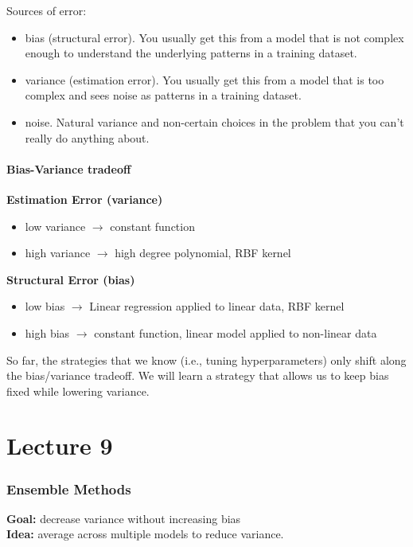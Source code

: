 \documentclass[12pt]{article}
\begin{document}
Sources of error:

\begin{itemize}
	\item bias (structural error). You usually get this from a model that is not complex enough to understand the underlying patterns in a training dataset. 
	\item variance (estimation error). You usually get this from a model that is too complex and sees noise as patterns in a training dataset.
	\item noise. Natural variance and non-certain choices in the problem that you can't really do anything about.
\end{itemize}

\subsection{Bias-Variance tradeoff}

\textbf{Estimation Error (variance)}
\begin{itemize}
	\item low variance $\rightarrow$ constant function
	\item high variance $\rightarrow$ high degree polynomial, RBF kernel 
\end{itemize}

\textbf{Structural Error (bias)}
\begin{itemize}
	\item low bias $\rightarrow$ Linear regression applied to linear data, RBF kernel 
	\item high bias $\rightarrow$ constant function, linear model applied to non-linear data
\end{itemize}

So far, the strategies that we know (i.e., tuning hyperparameters) only shift along the bias/variance tradeoff. We will learn a strategy that allows us to keep bias fixed while lowering variance.

\part{Lecture 9}

\section{Ensemble Methods}

\textbf{Goal:} decrease variance without increasing bias\\
\textbf{Idea:} average across multiple models to reduce variance.\\
\end{document}
